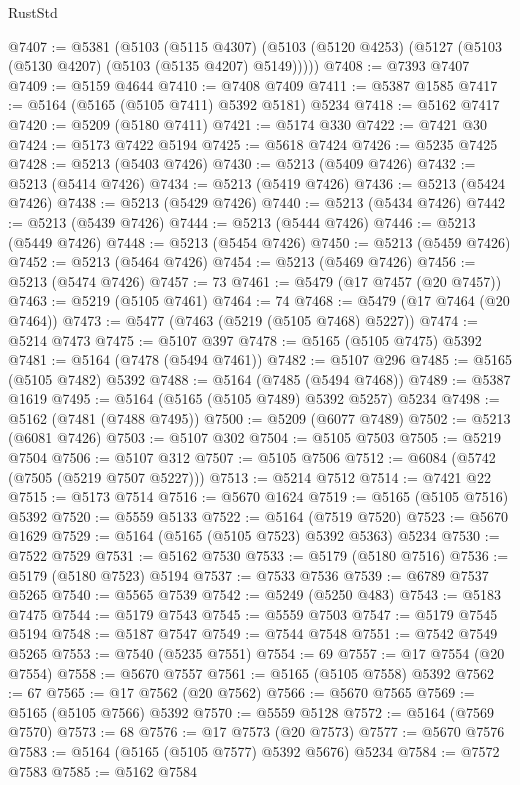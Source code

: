 \begin{lexlean}{RustStd}
\begin{coremodule}
@7407 := @5381
    (@5103
      (@5115 @4307)
      (@5103 (@5120 @4253) (@5127 (@5103 (@5130 @4207) (@5103 (@5135 @4207) @5149)))))
@7408 := @7393 @7407
@7409 := @5159 @4644
@7410 := @7408 @7409
@7411 := @5387 @1585
@7417 := @5164 (@5165 (@5105 @7411) @5392 @5181) @5234
@7418 := @5162 @7417
@7420 := @5209 (@5180 @7411)
@7421 := @5174 @330
@7422 := @7421 @30
@7424 := @5173 @7422 @5194
@7425 := @5618 @7424
@7426 := @5235 @7425
@7428 := @5213 (@5403 @7426)
@7430 := @5213 (@5409 @7426)
@7432 := @5213 (@5414 @7426)
@7434 := @5213 (@5419 @7426)
@7436 := @5213 (@5424 @7426)
@7438 := @5213 (@5429 @7426)
@7440 := @5213 (@5434 @7426)
@7442 := @5213 (@5439 @7426)
@7444 := @5213 (@5444 @7426)
@7446 := @5213 (@5449 @7426)
@7448 := @5213 (@5454 @7426)
@7450 := @5213 (@5459 @7426)
@7452 := @5213 (@5464 @7426)
@7454 := @5213 (@5469 @7426)
@7456 := @5213 (@5474 @7426)
@7457 := 73
@7461 := @5479 (@17 @7457 (@20 @7457))
@7463 := @5219 (@5105 @7461)
@7464 := 74
@7468 := @5479 (@17 @7464 (@20 @7464))
@7473 := @5477 (@7463 (@5219 (@5105 @7468) @5227))
@7474 := @5214 @7473
@7475 := @5107 @397
@7478 := @5165 (@5105 @7475) @5392
@7481 := @5164 (@7478 (@5494 @7461))
@7482 := @5107 @296
@7485 := @5165 (@5105 @7482) @5392
@7488 := @5164 (@7485 (@5494 @7468))
@7489 := @5387 @1619
@7495 := @5164 (@5165 (@5105 @7489) @5392 @5257) @5234
@7498 := @5162 (@7481 (@7488 @7495))
@7500 := @5209 (@6077 @7489)
@7502 := @5213 (@6081 @7426)
@7503 := @5107 @302
@7504 := @5105 @7503
@7505 := @5219 @7504
@7506 := @5107 @312
@7507 := @5105 @7506
@7512 := @6084 (@5742 (@7505 (@5219 @7507 @5227)))
@7513 := @5214 @7512
@7514 := @7421 @22
@7515 := @5173 @7514
@7516 := @5670 @1624
@7519 := @5165 (@5105 @7516) @5392
@7520 := @5559 @5133
@7522 := @5164 (@7519 @7520)
@7523 := @5670 @1629
@7529 := @5164 (@5165 (@5105 @7523) @5392 @5363) @5234
@7530 := @7522 @7529
@7531 := @5162 @7530
@7533 := @5179 (@5180 @7516)
@7536 := @5179 (@5180 @7523) @5194
@7537 := @7533 @7536
@7539 := @6789 @7537 @5265
@7540 := @5565 @7539
@7542 := @5249 (@5250 @483)
@7543 := @5183 @7475
@7544 := @5179 @7543
@7545 := @5559 @7503
@7547 := @5179 @7545 @5194
@7548 := @5187 @7547
@7549 := @7544 @7548
@7551 := @7542 @7549 @5265
@7553 := @7540 (@5235 @7551)
@7554 := 69
@7557 := @17 @7554 (@20 @7554)
@7558 := @5670 @7557
@7561 := @5165 (@5105 @7558) @5392
@7562 := 67
@7565 := @17 @7562 (@20 @7562)
@7566 := @5670 @7565
@7569 := @5165 (@5105 @7566) @5392
@7570 := @5559 @5128
@7572 := @5164 (@7569 @7570)
@7573 := 68
@7576 := @17 @7573 (@20 @7573)
@7577 := @5670 @7576
@7583 := @5164 (@5165 (@5105 @7577) @5392 @5676) @5234
@7584 := @7572 @7583
@7585 := @5162 @7584

\end{coremodule}
\end{lexlean}
